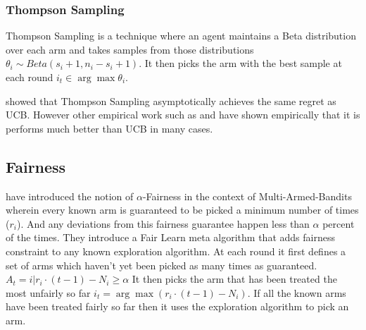 \subsubsection{Thompson Sampling}
Thompson Sampling is a technique where an agent maintains a Beta distribution over each arm and takes samples from those distributions $\theta_i \sim Beta(s_i + 1, n_i - s_i + 1)$. It then picks the arm with the best sample at each round $i_t \in \arg\max \theta_i$. 

 showed that Thompson Sampling asymptotically achieves the same regret as UCB. However other empirical work such as  and  have shown empirically that it is performs much better than UCB in many cases. 

\subsection{Fairness}
 have introduced the notion of $\alpha$-Fairness in the context of Multi-Armed-Bandits wherein every known arm is guaranteed to be picked a minimum number of times ($r_i$). And any deviations from this fairness guarantee happen less than $\alpha$ percent of the times. They introduce a Fair Learn meta algorithm that adds fairness constraint to any known exploration algorithm. At each round it first defines a set of arms which haven't yet been picked as many times as guaranteed. $A_t = {i | r_i \cdot (t-1) - N_i \geq \alpha}$ It then picks the arm that has been treated the most unfairly so far $i _t = \arg\max (r_i \cdot (t-1) - N_i)$. If all the known arms have been treated fairly so far then it uses the exploration algorithm to pick an arm.